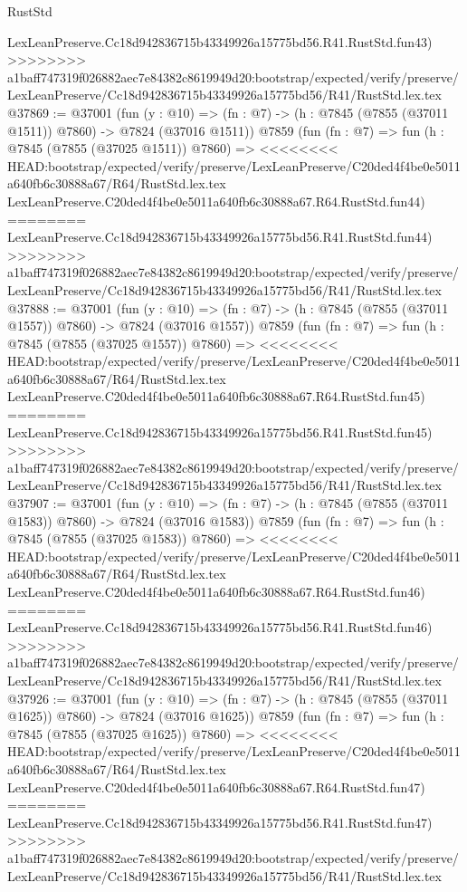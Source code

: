 \begin{lexlean}{RustStd}
\begin{coremodule}
{\begin{coremodule}
{{{{{{{{{{{{{{{{{{{{{{{{{{{{{{{{{{{{{{{{{{{{{{{{{{{{{{    LexLeanPreserve.Cc18d942836715b43349926a15775bd56.R41.RustStd.fun43)
>>>>>>>> a1baff747319f026882aec7e84382c8619949d20:bootstrap/expected/verify/preserve/LexLeanPreserve/Cc18d942836715b43349926a15775bd56/R41/RustStd.lex.tex
@37869 := @37001
    (fun (y : @10) => (fn : @7) -> (h : @7845 (@7855 (@37011 @1511)) @7860) -> @7824 (@37016 @1511))
    @7859
    (fun (fn : @7) =>
    fun (h : @7845 (@7855 (@37025 @1511)) @7860) =>
<<<<<<<< HEAD:bootstrap/expected/verify/preserve/LexLeanPreserve/C20ded4f4be0e5011a640fb6c30888a67/R64/RustStd.lex.tex
    LexLeanPreserve.C20ded4f4be0e5011a640fb6c30888a67.R64.RustStd.fun44)
========
    LexLeanPreserve.Cc18d942836715b43349926a15775bd56.R41.RustStd.fun44)
>>>>>>>> a1baff747319f026882aec7e84382c8619949d20:bootstrap/expected/verify/preserve/LexLeanPreserve/Cc18d942836715b43349926a15775bd56/R41/RustStd.lex.tex
@37888 := @37001
    (fun (y : @10) => (fn : @7) -> (h : @7845 (@7855 (@37011 @1557)) @7860) -> @7824 (@37016 @1557))
    @7859
    (fun (fn : @7) =>
    fun (h : @7845 (@7855 (@37025 @1557)) @7860) =>
<<<<<<<< HEAD:bootstrap/expected/verify/preserve/LexLeanPreserve/C20ded4f4be0e5011a640fb6c30888a67/R64/RustStd.lex.tex
    LexLeanPreserve.C20ded4f4be0e5011a640fb6c30888a67.R64.RustStd.fun45)
========
    LexLeanPreserve.Cc18d942836715b43349926a15775bd56.R41.RustStd.fun45)
>>>>>>>> a1baff747319f026882aec7e84382c8619949d20:bootstrap/expected/verify/preserve/LexLeanPreserve/Cc18d942836715b43349926a15775bd56/R41/RustStd.lex.tex
@37907 := @37001
    (fun (y : @10) => (fn : @7) -> (h : @7845 (@7855 (@37011 @1583)) @7860) -> @7824 (@37016 @1583))
    @7859
    (fun (fn : @7) =>
    fun (h : @7845 (@7855 (@37025 @1583)) @7860) =>
<<<<<<<< HEAD:bootstrap/expected/verify/preserve/LexLeanPreserve/C20ded4f4be0e5011a640fb6c30888a67/R64/RustStd.lex.tex
    LexLeanPreserve.C20ded4f4be0e5011a640fb6c30888a67.R64.RustStd.fun46)
========
    LexLeanPreserve.Cc18d942836715b43349926a15775bd56.R41.RustStd.fun46)
>>>>>>>> a1baff747319f026882aec7e84382c8619949d20:bootstrap/expected/verify/preserve/LexLeanPreserve/Cc18d942836715b43349926a15775bd56/R41/RustStd.lex.tex
@37926 := @37001
    (fun (y : @10) => (fn : @7) -> (h : @7845 (@7855 (@37011 @1625)) @7860) -> @7824 (@37016 @1625))
    @7859
    (fun (fn : @7) =>
    fun (h : @7845 (@7855 (@37025 @1625)) @7860) =>
<<<<<<<< HEAD:bootstrap/expected/verify/preserve/LexLeanPreserve/C20ded4f4be0e5011a640fb6c30888a67/R64/RustStd.lex.tex
    LexLeanPreserve.C20ded4f4be0e5011a640fb6c30888a67.R64.RustStd.fun47)
========
    LexLeanPreserve.Cc18d942836715b43349926a15775bd56.R41.RustStd.fun47)
>>>>>>>> a1baff747319f026882aec7e84382c8619949d20:bootstrap/expected/verify/preserve/LexLeanPreserve/Cc18d942836715b43349926a15775bd56/R41/RustStd.lex.tex
}}}}}}}}}}}}}}}}}}}}}}}}}}}}}}}}}}}}}}}}}}}}}}}}}}}}}}
\end{coremodule}}
\end{coremodule}
\end{lexlean}
